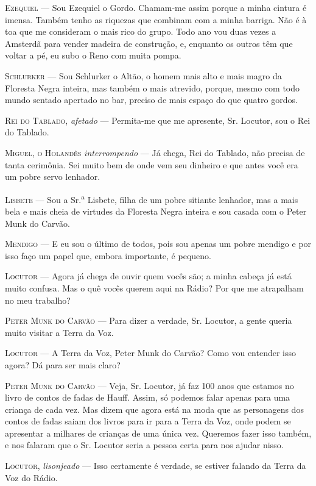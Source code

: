 \textsc{Ezequiel} --- Sou Ezequiel o Gordo. Chamam-me assim porque a minha cintura
é imensa. Também tenho as riquezas que combinam com a minha barriga. Não
é à toa que me consideram o mais rico do grupo. Todo ano vou duas vezes
a Amsterdã para vender madeira de construção, e, enquanto os outros têm
que voltar a pé, eu subo o Reno com muita pompa.

\textsc{Schlurker} --- Sou Schlurker o Altão, o homem mais alto e mais magro da
Floresta Negra inteira, mas também o mais atrevido, porque, mesmo com
todo mundo sentado apertado no bar, preciso de mais espaço do que quatro
gordos.

\textsc{Rei do Tablado}, \emph{afetado} --- Permita-me que me apresente, Sr.
Locutor, sou o Rei do Tablado.

\textsc{Miguel, o Holandês} \emph{interrompendo} --- Já chega, Rei do Tablado, não
precisa de tanta cerimônia. Sei muito bem de onde vem seu dinheiro e que
antes você era um pobre servo lenhador.

\textsc{Lisbete} --- Sou a Sr.\textsuperscript{a} Lisbete, filha de um pobre
sitiante lenhador, mas a mais bela e mais cheia de virtudes da Floresta
Negra inteira e sou casada com o Peter Munk do Carvão.

\textsc{Mendigo} --- E eu sou o último de todos, pois sou apenas um pobre mendigo
e por isso faço um papel que, embora importante, é pequeno.

\textsc{Locutor} --- Agora já chega de ouvir quem vocês são; a minha cabeça já
está muito confusa. Mas o quê vocês querem aqui na Rádio? Por que me
atrapalham no meu trabalho?

\textsc{Peter Munk do Carvão} --- Para dizer a verdade, Sr. Locutor, a gente
queria muito visitar a Terra da Voz.

\textsc{Locutor} --- A Terra da Voz, Peter Munk do Carvão? Como vou entender isso
agora? Dá para ser mais claro?

\textsc{Peter Munk do Carvão} --- Veja, Sr. Locutor, já faz 100 anos que estamos
no livro de contos de fadas de Hauff. Assim, só podemos falar apenas
para uma criança de cada vez. Mas dizem que agora está na moda que as
personagens dos contos de fadas saiam dos livros para ir para a Terra da
Voz, onde podem se apresentar a milhares de crianças de uma única vez.
Queremos fazer isso também, e nos falaram que o Sr. Locutor seria a
pessoa certa para nos ajudar nisso.

\textsc{Locutor}, \emph{lisonjeado} --- Isso certamente é verdade, se estiver
falando da Terra da Voz do Rádio.

